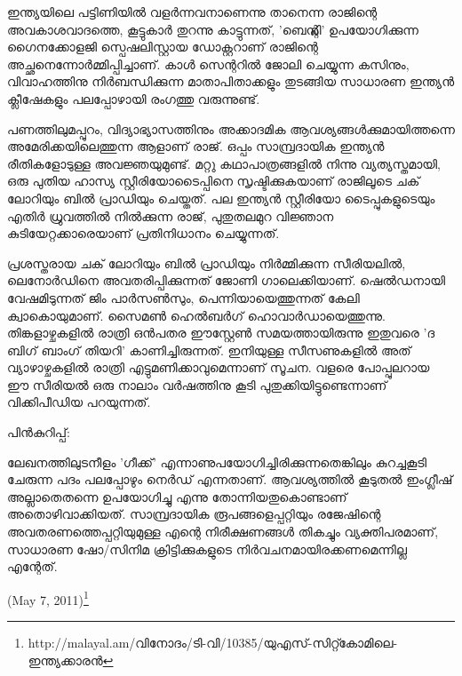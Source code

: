ഇന്ത്യയിലെ പട്ടിണിയില്‍ വളര്‍ന്നവനാണെന്നു താനെന്ന രാജിന്റെ അവകാശവാദത്തെ, കൂട്ടുകാര്‍ തുറന്നു കാട്ടുന്നത്, 'ബെന്റ്ലി' 
ഉപയോഗിക്കുന്ന ഗൈനക്കോളജി സ്പെഷലിസ്റ്റായ ഡോക്റ്ററാണ് രാജിന്റെ അച്ഛനെന്നോര്‍മ്മിപ്പിച്ചാണ്. കാള്‍ സെന്ററില്‍ ജോലി 
ചെയ്യുന്ന കസിനും, വിവാഹത്തിനു നിര്‍ബന്ധിക്കുന്ന മാതാപിതാക്കളും തുടങ്ങിയ സാധാരണ ഇന്ത്യന്‍ ക്ലീഷേകളും പലപ്പോഴായി
 രംഗത്തു വരുന്നുണ്ട്.

പണത്തിലുമപ്പുറം, വിദ്യാഭ്യാസത്തിനും അക്കാദമിക ആവശ്യങ്ങള്‍ക്കുമായിത്തന്നെ അമേരിക്കയിലെത്തുന്ന ആളാണ് രാജ്. ഒപ്പം 
സാമ്പ്രദായിക ഇന്ത്യന്‍ രീതികളോടുള്ള അവജ്ഞയുമുണ്ട്. മറ്റു കഥാപാത്രങ്ങളില്‍ നിന്നു വ്യത്യസ്തമായി, ഒരു പുതിയ ഹാസ്യ 
സ്റ്റീരിയോടൈപ്പിനെ സൃഷ്ടിക്കുകയാണ് രാജിലൂടെ ചക് ലോറിയും ബില്‍ പ്രാഡിയും ചെയ്തത്. പല ഇന്ത്യന്‍ സ്റ്റീരിയോ ടൈപ്പുകളുടെയും 
എതിര്‍ ധ്രുവത്തില്‍ നില്‍ക്കുന്ന രാജ്, പുതുതലമുറ വിജ്ഞാന കുടിയേറ്റക്കാരെയാണ് പ്രതിനിധാനം ചെയ്യുന്നത്.

പ്രശസ്തരായ ചക് ലോറിയും ബില്‍ പ്രാഡിയും നിര്‍മ്മിക്കുന്ന സീരിയലില്‍, ലെനോര്‍ഡിനെ അവതരിപ്പിക്കുന്നത് ജോണി 
ഗാലെക്കിയാണ്. ഷെല്‍ഡനായി വേഷമിടുന്നത് ജിം പാര്‍സണ്‍സും, പെന്നിയായെത്തുന്നത് കേലി ക്വാകൊയുമാണ്. സൈമണ്‍ 
ഹെല്‍ബര്‍ഗ് ഹൊവാര്‍ഡായെത്തുന്നു. തിങ്കളാഴ്ചകളില്‍ രാത്രി ഒന്‍പതര ഈസ്റ്റേണ്‍ സമയത്തായിരുന്നു ഇതുവരെ 
'ദ ബിഗ് ബാംഗ് തിയറി' കാണിച്ചിരുന്നത്. ഇനിയുള്ള സീസണുകളില്‍ അത് വ്യാഴാഴ്ചകളില്‍ രാത്രി എട്ടുമണിക്കാവുമെന്നാണ് സൂചന. 
വളരെ പോപ്പുലറായ ഈ സീരിയല്‍ ഒരു നാലാം വര്‍ഷത്തിനു കൂടി പുതുക്കിയിട്ടുണ്ടെന്നാണ് വിക്കിപീഡിയ പറയുന്നത്.

പിന്‍കുറിപ്പ്:

ലേഖനത്തിലുടനീളം 'ഗീക്ക്' എന്നാണുപയോഗിച്ചിരിക്കുന്നതെങ്കിലും കുറച്ചകൂടി ചേരുന്ന പദം പലപ്പോഴും നെര്‍ഡ് എന്നതാണ്. 
 ആവശ്യത്തില്‍ കൂടുതല്‍ ഇംഗ്ലീഷ് അല്ലാതെതന്നെ ഉപയോഗിച്ചു എന്നു തോന്നിയതുകൊണ്ടാണ് അതൊഴിവാക്കിയത്. 
 സാമ്പ്രദായിക രൂപങ്ങളെപ്പറ്റിയും രജേഷിന്റെ അവതരണത്തെപ്പറ്റിയുമുള്ള എന്റെ നിരീക്ഷണങ്ങള്‍ തികച്ചും വ്യക്തിപരമാണ്, 
 സാധാരണ ഷോ/സിനിമ ക്രിട്ടിക്കുകളുടെ നിര്‍വചനമായിരക്കണമെന്നില്ല എന്റേത്.
 
 (May 7, 2011)\footnote{http://malayal.am/വിനോദം/ടി-വി/10385/യുഎസ്-സിറ്റ്കോമിലെ-ഇന്ത്യക്കാരന്‍}

\newpage
